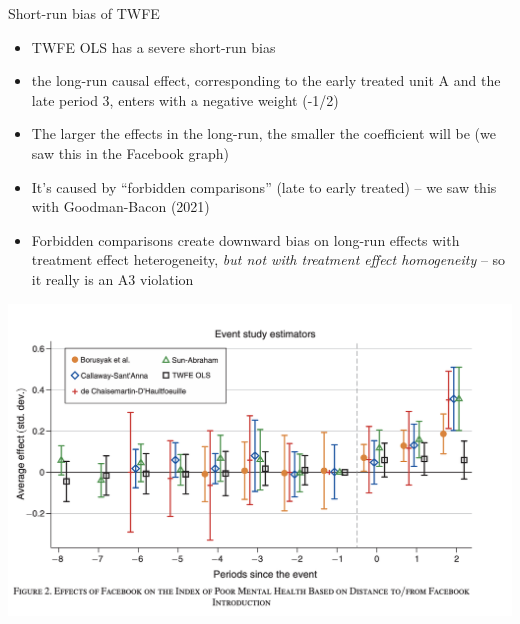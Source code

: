 \documentclass{beamer}
\begin{document}
\begin{frame}{Short-run bias of TWFE}

\begin{itemize}
\item TWFE OLS has a severe short-run bias
\item the long-run causal effect, corresponding to the early treated unit A and the late period 3, enters with a negative weight (-1/2)
\item The larger the effects in the long-run, the smaller the coefficient will be (we saw this in the Facebook graph)
\item It's caused by ``forbidden comparisons'' (late to early treated) -- we saw this with Goodman-Bacon (2021)
\item Forbidden comparisons create downward bias on long-run effects with treatment effect heterogeneity, \emph{but not with treatment effect homogeneity} -- so it really is an A3 violation
\end{itemize}

\end{frame}


\begin{frame}
\begin{center}
\includegraphics[scale=0.35]{./lecture_includes/facebook_3}
\end{center}
\end{frame}
\end{document}
